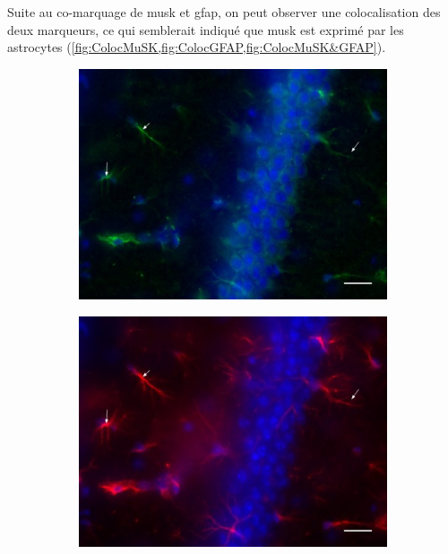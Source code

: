 	Suite au co-marquage de \gls{musk} et \gls{gfap}, on peut observer une colocalisation des deux marqueurs, ce qui semblerait indiqué que \gls{musk} est exprimé par les astrocytes (\cref{fig:ColocMuSK,fig:ColocGFAP,fig:ColocMuSK&GFAP}).
	
	\begin{figure}[h]
		\begin{center}
			\begin{subfigure}[h]{0.49\textwidth}
				\caption{}
				\label{fig:ColocMuSK}
				\includegraphics[width=\textwidth]{./Images/Immuno/Musk/MuSK-GFAP/M439_Mut_MuSK.jpg}
			\end{subfigure}
			\begin{subfigure}[h]{0.49\textwidth}
				\caption{}
				\label{fig:ColocGFAP}
				\includegraphics[width=\textwidth]{./Images/Immuno/Musk/MuSK-GFAP/M439_Mut_GFAP.jpg}

\end{subfigure}
\end{center}
\end{figure}
